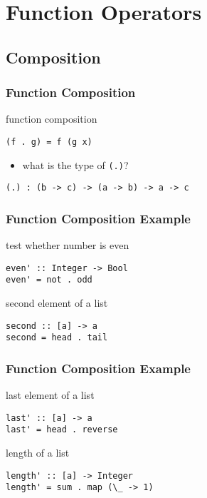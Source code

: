 \documentclass[dvipsnames]{beamer}
\theoremstyle{plain}
\begin{document}
\section{Function Operators}

\subsection{Composition}

\begin{frame}[fragile]
  \frametitle{Function Composition}

  \begin{block}{function composition}
    \begin{lstlisting}
(f . g) = f (g x)
    \end{lstlisting}
  \end{block}

  \pause
  \begin{itemize}
    \item what is the type of \lstinline|(.)|?
  \end{itemize}

  \begin{exampleblock}{}
    \begin{lstlisting}
(.) : (b -> c) -> (a -> b) -> a -> c
    \end{lstlisting}
  \end{exampleblock}
\end{frame}

\begin{frame}[fragile]
  \frametitle{Function Composition Example}

  \begin{exampleblock}{test whether number is even}
    \begin{lstlisting}
even' :: Integer -> Bool
even' = not . odd
    \end{lstlisting}
  \end{exampleblock}

  \pause
  \begin{exampleblock}{second element of a list}
    \begin{lstlisting}
second :: [a] -> a
second = head . tail
    \end{lstlisting}
  \end{exampleblock}
\end{frame}

\begin{frame}[fragile]
  \frametitle{Function Composition Example}

  \begin{exampleblock}{last element of a list}
    \begin{lstlisting}
last' :: [a] -> a
last' = head . reverse
    \end{lstlisting}
  \end{exampleblock}

  \pause
  \begin{exampleblock}{length of a list}
    \begin{lstlisting}
length' :: [a] -> Integer
length' = sum . map (\_ -> 1)
    \end{lstlisting}
  \end{exampleblock}
\end{frame}
\end{document}
